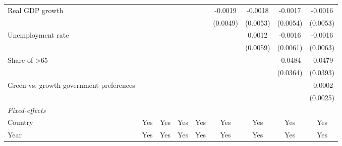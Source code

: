 \begin{table}[htbp]
\begin{tabular}{lcccccccc}
      Real GDP growth                                                                  &                       &          &                 &                 & -0.0019         & -0.0018         & -0.0017         & -0.0016\\   
                                                                                       &                       &          &                 &                 & (0.0049)        & (0.0053)        & (0.0054)        & (0.0053)\\   
      Unemployment rate                                                                &                       &          &                 &                 &                 & 0.0012          & -0.0016         & -0.0016\\   
                                                                                       &                       &          &                 &                 &                 & (0.0059)        & (0.0061)        & (0.0063)\\   
      Share of >65                                                                     &                       &          &                 &                 &                 &                 & -0.0484         & -0.0479\\   
                                                                                       &                       &          &                 &                 &                 &                 & (0.0364)        & (0.0393)\\   
      Green vs. growth government preferences                                          &                       &          &                 &                 &                 &                 &                 & -0.0002\\   
                                                                                       &                       &          &                 &                 &                 &                 &                 & (0.0025)\\   
      \midrule
      \emph{Fixed-effects}\\
      Country                                                                          & Yes                   & Yes      & Yes             & Yes             & Yes             & Yes             & Yes             & Yes\\  
      Year                                                                             & Yes                   & Yes      & Yes             & Yes             & Yes             & Yes             & Yes             & Yes\\  

\end{tabular}
\end{table}
